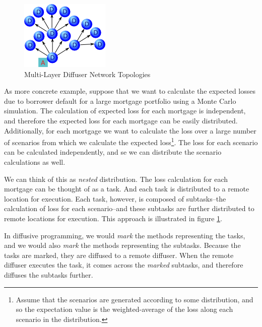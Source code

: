 \documentclass[11pt]{article}
\begin{document}
\begin{figure}[htbp]
\begin{center}
\includegraphics[scale=1.0]{topology_multi_layer}
\caption{Multi-Layer Diffuser Network Topologies\label{fig:topology_multi_layer}}
\end{center}
\end{figure}

As more concrete example, suppose that we want to calculate the expected losses due to borrower default for a large mortgage portfolio using a Monte Carlo simulation. The calculation of expected loss for each mortgage is independent, and therefore the expected loss for each mortgage can be easily distributed. Additionally, for each mortgage we want to calculate the loss over a large number of scenarios from which we calculate the expected loss\footnote{Assume that the scenarios are generated according to some distribution, and so the expectation value is the weighted-average of the loss along each scenario in the distribution.}. The loss for each scenario can be calculated independently, and se we can distribute the scenario calculations as well. 

We can think of this as \emph{nested} distribution. The loss calculation for each mortgage can be thought of as a task. And each task is distributed to a remote location for execution. Each task, however, is composed of subtasks--the calculation of loss for each scenario--and these subtasks are further distributed to remote locations for execution. This approach is illustrated in figure \ref{fig:topology_multi_layer}.

In diffusive programming, we would \emph{mark} the methods representing the tasks, and we would also \emph{mark} the methods representing the subtasks. Because the tasks are marked, they are diffused to a remote diffuser. When the remote diffuser executes the task, it comes across the \emph{marked} subtasks, and therefore diffuses the subtasks further.

\end{document}
